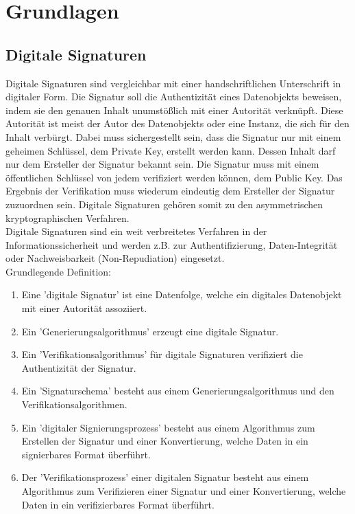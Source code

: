 \chapter{Grundlagen}

\section{Digitale Signaturen}
Digitale Signaturen sind vergleichbar mit einer handschriftlichen Unterschrift in digitaler Form. Die Signatur soll die Authentizität eines Datenobjekts beweisen, indem sie den genauen Inhalt unumstößlich mit einer Autorität verknüpft. Diese Autorität ist meist der Autor des Datenobjekts oder eine Instanz, die sich für den Inhalt verbürgt. Dabei muss sichergestellt sein, dass die Signatur nur mit einem geheimen Schlüssel, dem Private Key, erstellt werden kann. Dessen Inhalt darf nur dem Ersteller der Signatur bekannt sein. Die Signatur muss mit einem öffentlichen Schlüssel von jedem verifiziert werden können, dem Public Key. Das Ergebnis der Verifikation muss wiederum eindeutig dem Ersteller der Signatur zuzuordnen sein. Digitale Signaturen gehören somit zu den asymmetrischen kryptographischen Verfahren.\cite[S.29]{1841202}\cite[S.425f.]{548089}\\
Digitale Signaturen sind ein weit verbreitetes Verfahren in der Informationssicherheit und werden z.B. zur Authentifizierung, Daten-Integrität oder Nachweisbarkeit (Non-Repudiation) eingesetzt.\\
Grundlegende Definition\cite[S.426f.]{548089}:
\begin{enumerate}
\item Eine 'digitale Signatur' ist eine Datenfolge, welche ein digitales Datenobjekt mit einer Autorität assoziiert.
\item Ein 'Generierungsalgorithmus' erzeugt eine digitale Signatur.
\item Ein 'Verifikationsalgorithmus' für digitale Signaturen verifiziert die Authentizität der Signatur.
\item Ein 'Signaturschema' besteht aus einem Generierungsalgorithmus und den Verifikationsalgorithmen.
\item Ein 'digitaler Signierungsprozess' besteht aus einem Algorithmus zum Erstellen der Signatur und einer Konvertierung, welche Daten in ein signierbares Format überführt.
\item Der 'Verifikationsprozess' einer digitalen Signatur besteht aus einem Algorithmus zum Verifizieren einer Signatur und einer Konvertierung, welche Daten in ein verifizierbares Format überführt.\\
\end{enumerate}


